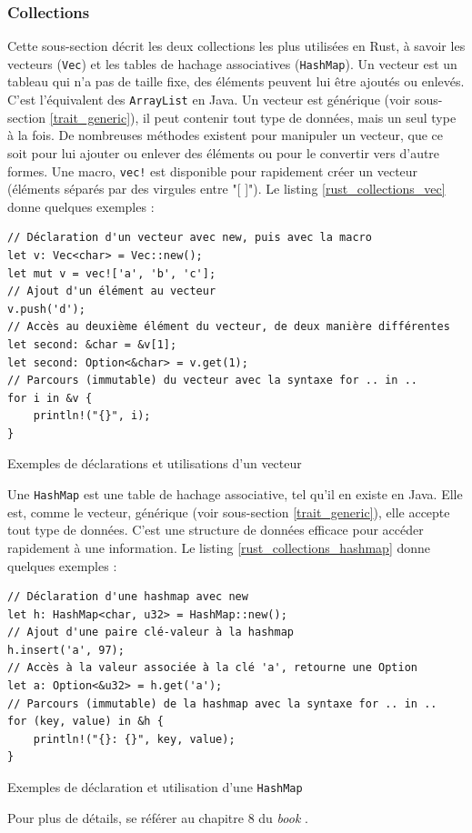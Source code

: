 \subsubsection{Collections}\label{rust_collections}
Cette sous-section décrit les deux collections les plus utilisées en Rust, à savoir les vecteurs 
(\texttt{Vec}) et les tables de 
hachage associatives (\texttt{HashMap}). Un vecteur est un tableau qui n'a pas de taille 
fixe, des éléments peuvent lui être ajoutés ou enlevés. C'est l'équivalent des \texttt{ArrayList} 
en Java. Un vecteur est générique (voir sous-section \ref{trait_generic}), il peut contenir tout type 
de données, mais un seul type à la fois. 
De nombreuses méthodes existent pour manipuler un vecteur, que ce soit pour lui ajouter ou enlever 
des éléments ou pour le convertir vers d'autre formes. Une macro, \texttt{vec!} est 
disponible pour rapidement créer un vecteur (éléments séparés par des virgules entre "[ ]").
Le listing \ref{rust_collections_vec} donne quelques exemples :
\bigbreak
\begin{code}
    \begin{verbatim}
// Déclaration d'un vecteur avec new, puis avec la macro
let v: Vec<char> = Vec::new();
let mut v = vec!['a', 'b', 'c'];
// Ajout d'un élément au vecteur
v.push('d');
// Accès au deuxième élément du vecteur, de deux manière différentes
let second: &char = &v[1];
let second: Option<&char> = v.get(1);
// Parcours (immutable) du vecteur avec la syntaxe for .. in ..
for i in &v {
    println!("{}", i);
}
    \end{verbatim}
    \caption{Exemples de déclarations et utilisations d'un vecteur}
    \label{rust_collections_vec}
\end{code}
\bigbreak
Une \texttt{HashMap} est une table de hachage associative, tel qu'il en existe en Java.
Elle est, comme le vecteur, générique (voir sous-section \ref{trait_generic}), elle accepte tout 
type de données. C'est une structure de données efficace pour accéder rapidement à une information.
Le listing \ref{rust_collections_hashmap} donne quelques exemples :
\bigbreak
\begin{code}
    \begin{verbatim}
// Déclaration d'une hashmap avec new
let h: HashMap<char, u32> = HashMap::new();
// Ajout d'une paire clé-valeur à la hashmap
h.insert('a', 97);
// Accès à la valeur associée à la clé 'a', retourne une Option
let a: Option<&u32> = h.get('a');
// Parcours (immutable) de la hashmap avec la syntaxe for .. in ..
for (key, value) in &h {
    println!("{}: {}", key, value);
}
    \end{verbatim}
    \caption{Exemples de déclaration et utilisation d'une \texttt{HashMap}}
    \label{rust_collections_hashmap}
\end{code}
\bigbreak
Pour plus de détails, se référer au chapitre 8 du \textit{book} \cite{ref0}.

